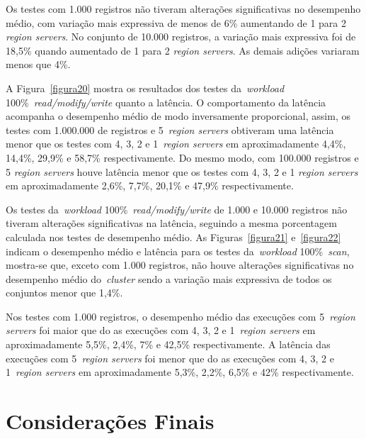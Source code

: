 \documentclass[12pt]{article}
\begin{document}
Os testes com 1.000 registros não tiveram alterações significativas no desempenho médio, com variação mais expressiva de menos de 6\% aumentando de 1 para 2 \emph{region servers}. 
No conjunto de 10.000 registros, a variação mais expressiva foi de 18,5\% quando aumentado de 1 para 2 \emph{region servers}. As demais adições variaram menos que 4\%.

A Figura~\ref{figura20} mostra os resultados dos testes da~\emph{workload} 100\%~\emph{read/modify/write} quanto a latência. 
O comportamento da latência acompanha o desempenho médio de modo inversamente proporcional, assim, os testes com 1.000.000 de registros e 5~\emph{region servers} obtiveram uma latência menor que os testes com 4, 3, 2 e 1~\emph{region servers} em aproximadamente 4,4\%, 14,4\%, 29,9\% e 58,7\% respectivamente. 
Do mesmo modo,  com 100.000 registros e 5 \emph{region servers} houve latência menor que os testes com 4, 3, 2 e 1 \emph{region servers} em aproximadamente 2,6\%, 7,7\%, 20,1\% e 47,9\% respectivamente.

Os testes da~\emph{workload} 100\%~\emph{read/modify/write} de 1.000 e 10.000 registros não tiveram alterações significativas na latência, seguindo a mesma porcentagem calculada nos testes de desempenho médio. 
As Figuras~\ref{figura21} e~\ref{figura22} indicam o desempenho médio e latência para os testes da~\emph{workload} 100\%~\emph{scan},  mostra-se que, exceto com 1.000 registros, não houve alterações significativas no desempenho médio do~\emph{cluster} sendo a variação mais expressiva de todos os conjuntos menor que 1,4\%. 

Nos testes com 1.000 registros, o desempenho médio das execuções com 5~\emph{region servers} foi maior que do as execuções com 4, 3, 2 e 1~\emph{region servers} em aproximadamente 5,5\%, 2,4\%, 7\% e 42,5\% respectivamente. 
A latência das execuções com 5~\emph{region servers} foi menor que do as execuções com 4, 3, 2 e 1~\emph{region servers} em aproximadamente 5,3\%, 2,2\%, 6,5\% e 42\% respectivamente.

\section{Considerações Finais}
\label{sec:finais}

\end{document}
